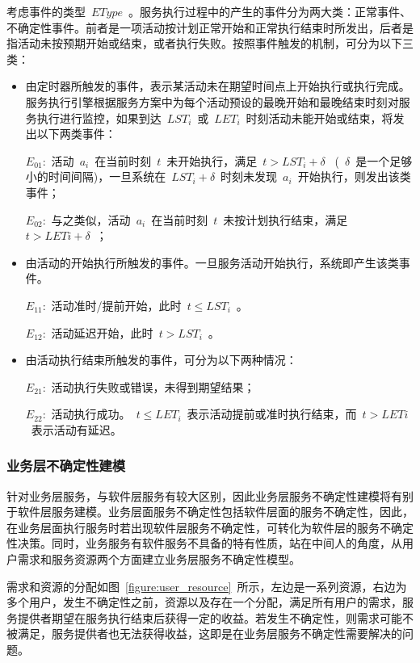 考虑事件的类型~$EType$~。服务执行过程中的产生的事件分为两大类：正常事件、不确定性事件。前者是一项活动按计划正常开始和正常执行结束时所发出，后者是指活动未按预期开始或结束，或者执行失败。按照事件触发的机制，可分为以下三类：

\begin{itemize}
    \item 由定时器所触发的事件，表示某活动未在期望时间点上开始执行或执行完成。服务执行引擎根据服务方案中为每个活动预设的最晚开始和最晚结束时刻对服务执行进行监控，如果到达~$LST_i$~或~$LET_i$~时刻活动未能开始或结束，将发出以下两类事件：
    
    $E_{01}$:~活动~$a_i$~在当前时刻~$t$~未开始执行，满足~$t>LST_i+\delta$~ (~$\delta$~是一个足够小的时间间隔)，一旦系统在~$LST_i+\delta$~时刻未发现~$a_i$~开始执行，则发出该类事件；
    
    $E_{02}$:~与之类似，活动~$a_i$~在当前时刻~$t$~未按计划执行结束，满足~$t>LETi+\delta$~；
    
    \item 由活动的开始执行所触发的事件。一旦服务活动开始执行，系统即产生该类事件。
    
    $E_{11}$:~活动准时/提前开始，此时~$t\le LST_i$~。
    
    $E_{12}$:~活动延迟开始，此时~$t>LST_i$~。
    
    \item 由活动执行结束所触发的事件，可分为以下两种情况：
    
    $E_{21}$:~活动执行失败或错误，未得到期望结果；
    
    $E_{22}$:~活动执行成功。~$t\le LET_i$~表示活动提前或准时执行结束，而~$t>LETi$~表示活动有延迟。
    
\end{itemize}

\subsubsection{业务层不确定性建模}

针对业务层服务，与软件层服务有较大区别，因此业务层服务不确定性建模将有别于软件层服务建模。业务层面服务不确定性包括软件层面的服务不确定性，因此，在业务层面执行服务时若出现软件层服务不确定性，可转化为软件层的服务不确定性决策。同时，业务服务有软件服务不具备的特有性质，站在中间人的角度，从用户需求和服务资源两个方面建立业务层服务不确定性模型。

需求和资源的分配如图~\ref{figure:user_resource}~所示，左边是一系列资源，右边为多个用户，发生不确定性之前，资源以及存在一个分配，满足所有用户的需求，服务提供者期望在服务执行结束后获得一定的收益。若发生不确定性，则需求可能不被满足，服务提供者也无法获得收益，这即是在业务层服务不确定性需要解决的问题。

